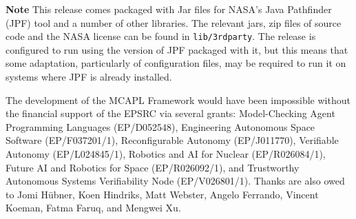 {\bf Note} This release comes packaged with Jar files for NASA's Java Pathfinder (JPF) tool and a number of other libraries.  The relevant jars, zip files of source code and the NASA license can be found in \texttt{lib/3rdparty}.  The release is configured to run using the version of JPF packaged with it, but this means that some adaptation, particularly of configuration files, may be required to run it on systems where JPF is already installed.

The development of the MCAPL Framework would have been impossible without the financial support of the EPSRC via several grants: Model-Checking Agent Programming Languages (EP/D052548), Engineering Autonomous Space Software (EP/F037201/1), Reconfigurable Autonomy (EP/J011770), Verifiable Autonomy (EP/L024845/1), Robotics and AI for Nuclear (EP/R026084/1), Future AI and Robotics for Space (EP/R026092/1), and Trustworthy Autonomous Systems Verifiability Node (EP/V026801/1).  Thanks are also owed to Jomi H\"{u}bner, Koen Hindriks, Matt Webster, Angelo Ferrando, Vincent Koeman, Fatma Faruq, and Mengwei Xu.
